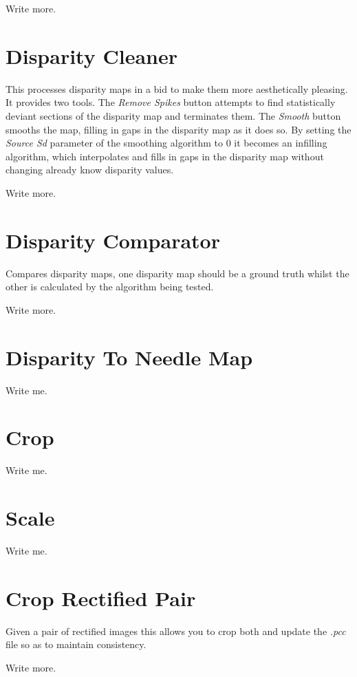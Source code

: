 \documentclass[10pt,a4paper,twoside]{article}
\begin{document}
Write more.



\section{Disparity Cleaner}
This processes disparity maps in a bid to make them more aesthetically pleasing.
It provides two tools.
The \emph{Remove Spikes} button attempts to find statistically deviant sections of the disparity map and terminates them.
The \emph{Smooth} button smooths the map, filling in gaps in the disparity map as it does so.
By setting the \emph{Source Sd} parameter of the smoothing algorithm to $0$ it becomes an infilling algorithm, which interpolates and fills in gaps in the disparity map without changing already know disparity values.

Write more.



\section{Disparity Comparator}
Compares disparity maps, one disparity map should be a ground truth whilst the other is calculated by the algorithm being tested.

Write more.



\section{Disparity To Needle Map}
Write me.



\section{Crop}
Write me.



\section {Scale}
Write me.



\section{Crop Rectified Pair}
Given a pair of rectified images this allows you to crop both and update the \emph{.pcc} file so as to maintain consistency.

Write more.
\end{document}
